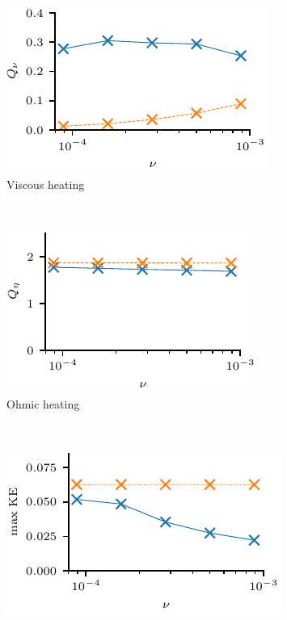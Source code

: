 \begin{figure}[t]
    \centering
    \begin{subfigure}[t]{0.32\textwidth}
      \includegraphics[width=\textwidth]{visc_heating_varying_viscosity.pdf}
      \caption{Viscous heating}
    \end{subfigure}%
    ~
    \begin{subfigure}[t]{0.32\textwidth}
      \includegraphics[width=\textwidth]{ohmic_heating_varying_viscosity.pdf}
      \caption{Ohmic heating}
    \end{subfigure}
    ~
    \begin{subfigure}[t]{0.32\textwidth}
      \includegraphics[width=\textwidth]{max_kinetic_changing_visc.pdf}

\end{subfigure}
\end{figure}
